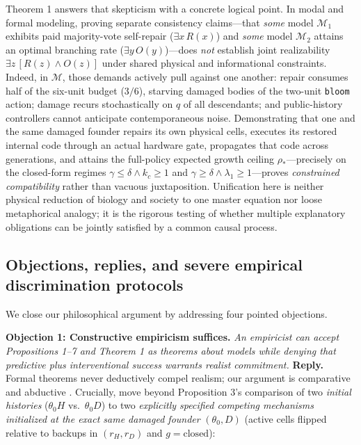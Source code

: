 \documentclass[11pt,a4paper]{article}
\begin{document}
Theorem 1 answers that skepticism with a concrete logical point. In
modal and formal modeling, proving separate consistency claims---that
\emph{some} model \(\mathcal{M}_1\) exhibits paid majority-vote
self-repair (\(\exists x\, R(x)\)) and \emph{some} model
\(\mathcal{M}_2\) attains an optimal branching rate
(\(\exists y\, O(y)\))---does \emph{not} establish joint realizability
\(\exists z\, [R(z) \land O(z)]\) under shared physical and
informational constraints. Indeed, in \(\mathcal{M}\), those demands
actively pull against one another: repair consumes half of the six-unit
budget (\(3/6\)), starving damaged bodies of the two-unit \texttt{bloom}
action; damage recurs stochastically on \(q\) of all descendants; and
public-history controllers cannot anticipate contemporaneous noise.
Demonstrating that one and the same damaged founder repairs its own
physical cells, executes its restored internal code through an actual
hardware gate, propagates that code across generations, and attains the
full-policy expected growth ceiling \(\rho_*\)---precisely on the
closed-form regimes \(\gamma \le \delta \land k_c \ge 1\) and
\(\gamma \ge \delta \land \lambda_1 \ge 1\)---proves \emph{constrained
compatibility} rather than vacuous juxtaposition. Unification here is
neither physical reduction of biology and society to one master equation
nor loose metaphorical analogy; it is the rigorous testing of whether
multiple explanatory obligations can be jointly satisfied by a common
causal process.

\subsection{Objections, replies, and severe empirical discrimination
protocols}\label{objections-replies-and-severe-empirical-discrimination-protocols}

We close our philosophical argument by addressing four pointed
objections.

\textbf{Objection 1: Constructive empiricism suffices.} \emph{An
empiricist \citep{vanFraassen1980} can accept Propositions 1--7 and
Theorem 1 as theorems about models while denying that predictive plus
interventional success warrants realist commitment.} \textbf{Reply.}
Formal theorems never deductively compel realism; our argument is
comparative and abductive \citep{hacking1983, woodward2003}. Crucially,
move beyond Proposition 3's comparison of two \emph{initial histories}
(\(\theta_0 H\) vs.~\(\theta_0 D\)) to two \emph{explicitly specified
competing mechanisms initialized at the exact same damaged founder}
\((\theta_0, D)\) (active cells flipped relative to backups in
\((r_H, r_D)\) and \(g = \mathrm{closed}\)):
\end{document}
